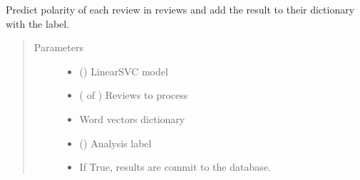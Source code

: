 \documentclass[letterpaper,10pt,english]{sphinxmanual}
\begin{document}
\begin{fulllineitems}
\label{\detokenize{learning:loacore.learning.svm.commit_analysis}}
Predict polarity of each review in reviews and add the result to their  dictionary with the
 label.
\begin{quote}\begin{description}
\item[{Parameters}] \leavevmode\begin{itemize}
\item {} 
 () \textendash{} LinearSVC model

\item {} 
 ( of {\hyperref[\detokenize{classes:loacore.classes.classes.Review}]{}}) \textendash{} Reviews to process

\item {} 
 \textendash{} Word vectors dictionary

\item {} 
 () \textendash{} Analysis label

\item {} 
 \textendash{} If True, results are commit to the database.

\end{itemize}

\end{description}\end{quote}

\end{fulllineitems}

\end{document}
